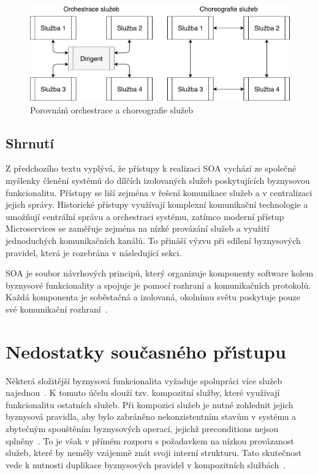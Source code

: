 \begin{figure}
    \centering
    \includegraphics[keepaspectratio=true, width=0.7\linewidth]{figures/choreography-orchestration.pdf}
    \caption{Porovnán\'{\i} orchestrace a choreografie služeb}
    \label{fig:choreography-orchestration}
\end{figure}

\subsection{Shrnutí}

Z předchozího textu vyplývá, že přístupy k realizaci \gls{SOA} vychází ze společné
myšlenky členění systémů do dílčích izolovaných služeb poskytujících byznysovou funkcionalitu.
Přístupy se liší zejména v řešení komunikace služeb a v centralizaci jejich správy.
Historické přístupy využívají komplexní komunikační technologie a umožňují centrální
správu a orchestraci systému, zatímco moderní přístup Microservices se zaměřuje zejména
na nízké provázání služeb a využití jednoduchých komunikačních kanálů.
To přináší výzvu při sdílení byznysových pravidel, která je rozebrána v následující sekci.

\begin{definition}
    \gls{SOA} je soubor návrhových principů, který organizuje komponenty software
    kolem byznysové funkcionality a spojuje je pomocí rozhraní a komunikačních protokolů.
    Každá komponenta je soběstačná a izolovaná, okolnímu světu poskytuje pouze
    své komunikační rozhraní~\cite{lewis2014microservices, papazoglou2003service}.
\end{definition}

\section{Nedostatky současného př\'{\i}stupu}\label{sec:shortcomings}

Některá složitější byznysová funkcionalita vyžaduje spolupráci více služeb
najednou~\cite{papazoglou2003service}. K tomuto účelu slouží tzv. kompozitní
služby, které využívají funkcionalitu ostatních služeb. Při kompozici služeb je nutné
zohlednit jejich byznysová pravidla, aby bylo zabráněno nekonzistentním stavům v systému
a zbytečným spouštěním byznysových operací, jejichž preconditions nejsou
splněny~\cite{cerny2017disambiguation}. To je však v přímém rozporu s požadavkem na nízkou
provázanost služeb, které by neměly vzájemně znát svoji interní strukturu. Tato skutečnost
vede k nutnosti duplikace byznysových pravidel v kompozitních službách~\cite{cerny2016survey}.

